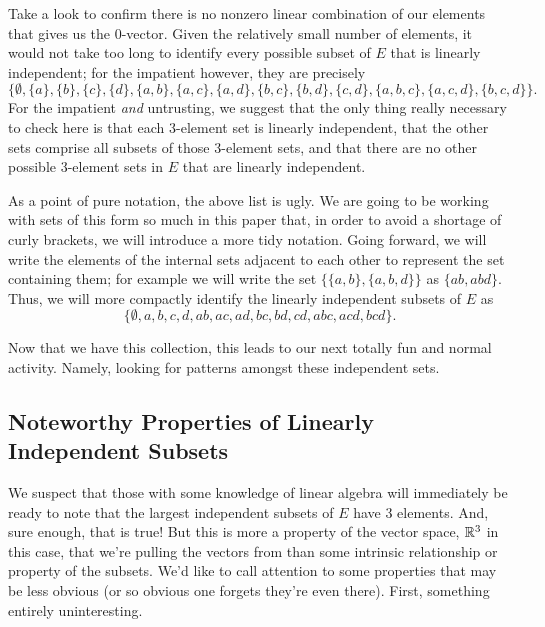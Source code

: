 \documentclass[12pt,oneside]{../../sfsuthesis}
\begin{document}
Take a look to confirm there is no nonzero linear combination of our elements that gives us the \( 0 \)-vector.
Given the relatively small number of elements, it would not take too long to identify every possible subset of \( E \) that is linearly independent;
for the impatient however, they are precisely
\[
    \big\{
    \emptyset,
    \{ a \},  \{ b \},  \{ c \},  \{ d \},
    \{ a,b \},  \{ a,c \},  \{ a,d \},  \{ b,c \},  \{ b,d \}, \{ c, d \},
    \{ a, b, c \},  \{ a, c, d \}, \{ b, c, d\}
    \big\}.
\]
For the impatient \emph{and} untrusting, we suggest that the only thing really necessary to check here is that each 3-element set is linearly independent, that the other sets comprise all subsets of those 3-element sets, and that there are no other possible 3-element sets in \( E \) that are linearly independent.

As a point of pure notation, the above list is ugly.
We are going to be working with sets of this form so much in this paper that, in order to avoid a shortage of curly brackets, we will introduce a more tidy notation.
Going forward, we will write the elements of the internal sets adjacent to each other to represent the set containing them; for example we will write the set \( \big\{ \{ a, b \}, \{ a, b, d \} \big\} \) as \( \{ ab, abd \} \).
Thus, we will more compactly identify the linearly independent subsets of \( E \) as
\[
    \{
    \emptyset,
    a, b, c, d,
    ab, ac, ad, bc, bd, cd,
    abc, acd, bcd
    \}.
\]

Now that we have this collection,
this leads to our next totally fun and normal activity.
Namely, looking for patterns amongst these independent sets.

\subsection{Noteworthy Properties of Linearly Independent Subsets}

We suspect that those with some knowledge of linear algebra will immediately be ready to note that the largest independent subsets of \( E \) have 3 elements.
And, sure enough, that is true!
But this is more a property of the vector space, \( \mathbb{R}^3 \) in this case, that we're pulling the vectors from than some intrinsic relationship or property of the subsets.
We'd like to call attention to some properties that may be less obvious (or so obvious one forgets they're even there).
First, something entirely uninteresting.
\end{document}
